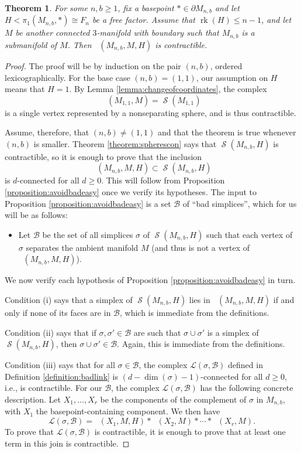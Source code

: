 \documentclass[11pt]{amsart}
\numberwithin{equation}{section}
\theoremstyle{plain}
\newtheorem{theorem}{Theorem}[section]
\theoremstyle{definition}
\theoremstyle{remark}
\DeclareMathOperator{\rank}{rk}
\newcommand\cB{\ensuremath{\mathcal{B}}}
\newcommand\cL{\ensuremath{\mathcal{L}}}
\DeclareMathOperator{\Spheres}{\mathcal{S}}
\DeclareMathOperator{\SpheresNS}{\Spheres_{\text{ns}}}
\begin{document}
\begin{theorem}
\label{theorem:spheresnscon}
For some $n,b \geq 1$, fix a basepoint $\ast \in \partial M_{n,b}$
and let $H < \pi_1(M_{n,b},\ast) \cong F_n$ be a free factor.  Assume
that $\rank(H) \leq n-1$, and let $M$ be another connected $3$-manifold
with boundary such that $M_{n,b}$ is a submanifold of $M$.  
Then $\SpheresNS(M_{n,b},M,H)$ is contractible.
\end{theorem}
\begin{proof}
The proof will be by induction on the pair $(n,b)$, ordered lexicographically.  For the base case $(n,b) = (1,1)$, our
assumption on $H$ means that $H = 1$.  By Lemma \ref{lemma:changeofcoordinates}, the
complex
\[\SpheresNS(M_{1,1},M) = \Spheres(M_{1,1})\]
is a single vertex represented by a nonseparating sphere, and is thus contractible.  

Assume, therefore, that $(n,b) \neq (1,1)$ and that the theorem is true whenever $(n,b)$ is smaller.
Theorem \ref{theorem:spherescon} says that $\Spheres(M_{n,b},H)$ is contractible,
so it is enough to prove that the inclusion 
\[\SpheresNS(M_{n,b},M,H) \subset \Spheres(M_{n,b},H)\]
is $d$-connected for all $d \geq 0$.  This will follow from Proposition \ref{proposition:avoidbadeasy}
once we verify its hypotheses.
The input to Proposition \ref{proposition:avoidbadeasy} is a set $\cB$ of ``bad simplices'', which
for us will be as follows:
\begin{itemize}
\item Let $\cB$ be the set of all simplices $\sigma$ of $\Spheres(M_{n,b},H)$ such that
each vertex of $\sigma$ separates the ambient manifold $M$ (and thus is not a vertex of
$\SpheresNS(M_{n,b},M,H)$).
\end{itemize}
We now verify each hypothesis of Proposition \ref{proposition:avoidbadeasy} in turn.

Condition (i) says that a simplex of $\Spheres(M_{n,b},H)$ lies in $\SpheresNS(M_{n,b},M,H)$ if
and only if none of its faces are in $\cB$, which is immediate from the definitions.

Condition (ii) says that if $\sigma,\sigma' \in \cB$ are such that $\sigma \cup \sigma'$ is a simplex
of $\Spheres(M_{n,b},H)$, then $\sigma \cup \sigma' \in \cB$.  Again, this is immediate from
the definitions.

Condition (iii) says that for all $\sigma \in \cB$, the complex
$\cL(\sigma,\cB)$ defined in Definition \ref{definition:badlink} is $(d-\dim(\sigma)-1)$-connected
for all $d \geq 0$, i.e., is contractible.  For our $\cB$, the complex $\cL(\sigma,\cB)$
has the following concrete description.  Let $X_1,\ldots,X_r$ be the components of the
complement of $\sigma$ in $M_{n,b}$, with $X_1$ the basepoint-containing component.  We
then have
\begin{equation}
\label{eqn:spheresnsjoin}
\cL(\sigma,\cB) = \SpheresNS(X_1,M,H) \ast \SpheresNS(X_2,M) \ast \cdots \ast \SpheresNS(X_r,M).
\end{equation}
To prove that $\cL(\sigma,\cB)$ is contractible, it is enough to prove that at least one
term in this join is contractible.


\end{proof}
\end{document}
